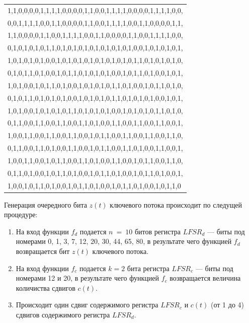 \documentclass{./civarticle}
\begin{document}
\begin{itemize}
\begin{longtable}{|p{7.5cm}|}
1,1,0,0,0,0,1,1,1,1,0,0,0,0,1,1,0,0,1,1,1,1,0,0,0,0,1,1,1,1,0,0, \\
0,0,1,1,1,1,0,0,1,1,0,0,0,0,1,1,0,0,1,1,1,1,0,0,1,1,0,0,0,0,1,1, \\
1,1,0,0,0,0,1,1,0,0,1,1,1,1,0,0,1,1,0,0,0,0,1,1,0,0,1,1,1,1,0,0, \\
0,1,0,1,0,1,0,1,1,0,1,0,1,0,1,0,1,0,1,0,1,0,1,0,0,1,0,1,0,1,0,1, \\
1,0,1,0,1,0,1,0,0,1,0,1,0,1,0,1,0,1,0,1,0,1,0,1,1,0,1,0,1,0,1,0, \\
0,1,0,1,1,0,1,0,0,1,0,1,1,0,1,0,1,0,1,0,0,1,0,1,1,0,1,0,0,1,0,1, \\
1,0,1,0,0,1,0,1,1,0,1,0,0,1,0,1,0,1,0,1,1,0,1,0,0,1,0,1,1,0,1,0, \\
0,1,0,1,1,0,1,0,1,0,1,0,0,1,0,1,0,1,0,1,1,0,1,0,1,0,1,0,0,1,0,1, \\
1,0,1,0,0,1,0,1,0,1,0,1,1,0,1,0,1,0,1,0,0,1,0,1,0,1,0,1,1,0,1,0, \\
0,1,1,0,0,1,1,0,0,1,1,0,0,1,1,0,1,0,0,1,1,0,0,1,1,0,0,1,1,0,0,1, \\
1,0,0,1,1,0,0,1,1,0,0,1,1,0,0,1,0,1,1,0,0,1,1,0,0,1,1,0,0,1,1,0, \\
0,1,1,0,0,1,1,0,1,0,0,1,1,0,0,1,0,1,1,0,0,1,1,0,1,0,0,1,1,0,0,1, \\
1,0,0,1,1,0,0,1,0,1,1,0,0,1,1,0,1,0,0,1,1,0,0,1,0,1,1,0,0,1,1,0, \\
0,1,1,0,1,0,0,1,0,1,1,0,1,0,0,1,0,1,1,0,1,0,0,1,0,1,1,0,1,0,0,1, \\
1,0,0,1,0,1,1,0,1,0,0,1,0,1,1,0,1,0,0,1,0,1,1,0,1,0,0,1,0,1,1,0 \\
\hline
\end{longtable}
\end{itemize}

Генерация очередного бита $z(t)$ ключевого потока происходит по следущей процедуре:
\begin{enumerate}
    \item На вход функции $f_d$ подается $n~=~10$ битов регистра $LFSR_d$ --- биты под номерами 0, 1, 3, 7, 12, 20, 30, 44, 65, 80, в результате чего функцией $f_d$ возвращается бит $z(t)$ ключевого потока.
    \item На вход функции $f_c$ подается $k = 2$ бита регистра $LFSR_c$ --- биты под номерами 12 и 20, в результате чего функцией $f_c$ возвращается величина количиства сдвигов $c(t)$.
    \item Происходит один сдвиг содержимого регистра $LFSR_c$ и $c(t)$ (от 1 до 4) сдвигов содержимого регистра $LFSR_d$.
\end{enumerate}
\end{document}
